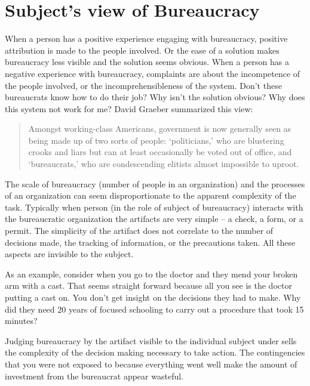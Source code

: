 \section{Subject's view of Bureaucracy\label{sec:subjects-view}}


When a person has a positive experience engaging with bureaucracy, positive attribution is made to the people involved. Or the ease of a solution makes bureaucracy less visible and the solution seems obvious. 
When a person has a negative experience with bureaucracy, complaints are about the incompetence of the people involved, or the incomprehensibleness of the system. Don't these bureaucrats know how to do their job? Why isn't the solution obvious? Why does this system not work for me? David Graeber summarized this view:
\begin{quote}
 Amongst working-class Americans, government is now generally seen as being made up of two sorts of people: `politicians,' who are blustering crooks and liars but can at least occasionally be voted out of office, and `bureaucrats,' who are condescending elitists almost impossible to uproot.   
\end{quote}


The scale of bureaucracy (number of people in an organization) and the processes of an organization can seem disproportionate to the apparent complexity of the task. Typically when person (in the role of subject of bureaucracy) interacts with the bureaucratic organization the artifacts are very simple -- a check, a form, or a permit. The simplicity of the artifact does not correlate to the number of decisions made, the tracking of information, or the precautions taken. All these aspects are invisible to the subject.

As an example, consider when you go to the doctor and they mend your broken arm with a cast. That seems straight forward because all you see is the doctor putting a cast on. You don't get insight on the decisions they had to make. Why did they need 20 years of focused schooling to carry out a procedure that took 15 minutes?

Judging bureaucracy by the artifact visible to the individual subject under sells the complexity of the decision making necessary to take action. The contingencies that you were not exposed to because everything went well make the amount of investment from the bureaucrat appear wasteful.


